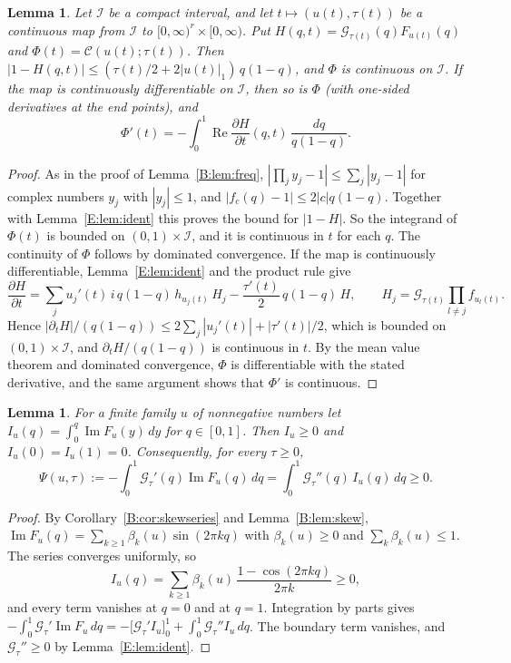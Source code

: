 \documentclass[11pt]{amsart}
\newtheorem{lemma}[theorem]{Lemma}
\theoremstyle{remark}
\numberwithin{equation}{section}
\begin{document}
\begin{lemma}\label{E:lem:diff}
Let $\mathcal I$ be a compact interval, and let $t\mapsto(u(t),\tau(t))$ be a continuous map from $\mathcal I$ to $[0,\infty)^r\times[0,\infty)$. Put $H(q,t)=\mathcal G_{\tau(t)}(q)F_{u(t)}(q)$ and $\Phi(t)=\mathcal C(u(t);\tau(t))$. Then $|1-H(q,t)|\le(\tau(t)/2+2|u(t)|_1)\,q(1-q)$, and $\Phi$ is continuous on $\mathcal I$. If the map is continuously differentiable on $\mathcal I$, then so is $\Phi$ (with one-sided derivatives at the end points), and
\[
\Phi'(t)=-\int_0^1\operatorname{Re}\frac{\partial H}{\partial t}(q,t)\,\frac{dq}{q(1-q)}.
\]
\end{lemma}

\begin{proof}
As in the proof of Lemma~\ref{B:lem:freq}, $|\prod_jy_j-1|\le\sum_j|y_j-1|$ for complex numbers $y_j$ with $|y_j|\le1$, and $|f_c(q)-1|\le2|c|q(1-q)$. Together with Lemma~\ref{E:lem:ident} this proves the bound for $|1-H|$. So the integrand of $\Phi(t)$ is bounded on $(0,1)\times\mathcal I$, and it is continuous in $t$ for each $q$. The continuity of $\Phi$ follows by dominated convergence. If the map is continuously differentiable, Lemma~\ref{E:lem:ident} and the product rule give
\[
\frac{\partial H}{\partial t}=\sum_ju_j'(t)\,i\,q(1-q)\,h_{u_j(t)}\,H_j-\frac{\tau'(t)}2\,q(1-q)\,H,\qquad H_j=\mathcal G_{\tau(t)}\prod_{l\ne j}f_{u_l(t)}.
\]
Hence $|\partial_tH|/(q(1-q))\le2\sum_j|u_j'(t)|+|\tau'(t)|/2$, which is bounded on $(0,1)\times\mathcal I$, and $\partial_tH/(q(1-q))$ is continuous in $t$. By the mean value theorem and dominated convergence, $\Phi$ is differentiable with the stated derivative, and the same argument shows that $\Phi'$ is continuous.
\end{proof}

\begin{lemma}\label{E:lem:sign}
For a finite family $u$ of nonnegative numbers let $I_u(q)=\int_0^q\operatorname{Im}F_u(y)\,dy$ for $q\in[0,1]$. Then $I_u\ge0$ and $I_u(0)=I_u(1)=0$. Consequently, for every $\tau\ge0$,
\[
\Psi(u,\tau):=-\int_0^1\mathcal G_\tau'(q)\operatorname{Im}F_u(q)\,dq=\int_0^1\mathcal G_\tau''(q)\,I_u(q)\,dq\ge0.
\]
\end{lemma}

\begin{proof}
By Corollary~\ref{B:cor:skewseries} and Lemma~\ref{B:lem:skew}, $\operatorname{Im}F_u(q)=\sum_{k\ge1}\beta_k(u)\sin(2\pi kq)$ with $\beta_k(u)\ge0$ and $\sum_k\beta_k(u)\le1$. The series converges uniformly, so
\[
I_u(q)=\sum_{k\ge1}\beta_k(u)\,\frac{1-\cos(2\pi kq)}{2\pi k}\ge0,
\]
and every term vanishes at $q=0$ and at $q=1$. Integration by parts gives $-\int_0^1\mathcal G_\tau'\operatorname{Im}F_u\,dq=-\bigl[\mathcal G_\tau'I_u\bigr]_0^1+\int_0^1\mathcal G_\tau''I_u\,dq$. The boundary term vanishes, and $\mathcal G_\tau''\ge0$ by Lemma~\ref{E:lem:ident}.
\end{proof}
\end{document}
